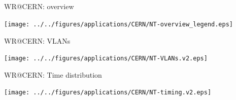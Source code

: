 \documentclass[compress,red]{beamer}
\begin{document}
\subsection{}
\begin{frame}{WR@CERN: overview}


      \begin{center}
	\texttt{[image: ../../figures/applications/CERN/NT-overview\_legend.eps]}
      \end{center}  

\end{frame}
\begin{frame}{WR@CERN: VLANs}

      \begin{center}
	\texttt{[image: ../../figures/applications/CERN/NT-VLANs.v2.eps]}
      \end{center}  

\end{frame}
\begin{frame}{WR@CERN: Time distribution}


      \begin{center}
	\texttt{[image: ../../figures/applications/CERN/NT-timing.v2.eps]}
      \end{center}  

\end{frame}
\end{document}
